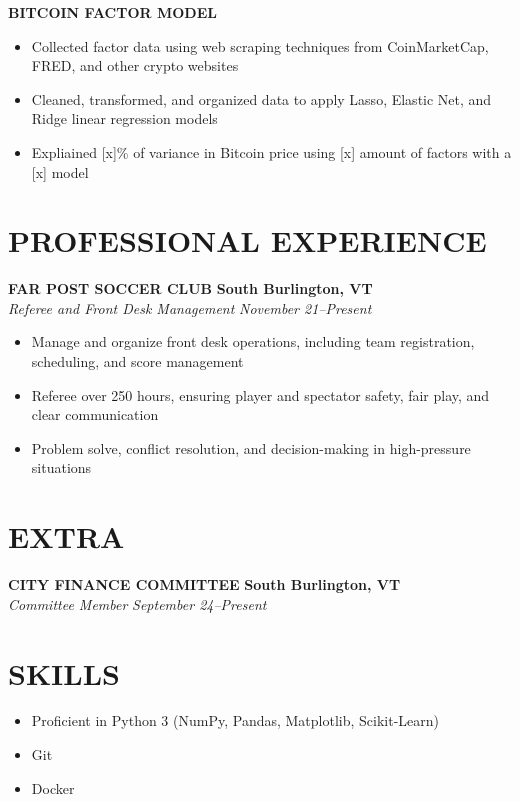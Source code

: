 \documentclass[11pt,letterpaper]{article}
\newcommand{\role}[4]{
  \begin{center}
  \textbf{#1} \hfill \textbf{#2} \\
  \textit{#3} \hfill \textit{#4}
  \end{center}
}
\begin{document}
\begin{flushleft}
  \textbf{BITCOIN FACTOR MODEL}
  \begin{itemize}[leftmargin=*,nosep]
    \item Collected factor data using web scraping techniques from CoinMarketCap, FRED, and other crypto websites
    \item Cleaned, transformed, and organized data to apply Lasso, Elastic Net, and Ridge linear regression models 
    \item Expliained [x]\% of variance in Bitcoin price using [x] amount of factors with a [x] model
  \end{itemize}
\end{flushleft}

\section{PROFESSIONAL EXPERIENCE}
\vspace{1em}
\role{FAR POST SOCCER CLUB}{South Burlington, VT}{Referee and Front Desk Management}{November 21--Present}
\begin{itemize}[leftmargin=*,nosep]
  \item Manage and organize front desk operations, including team registration, scheduling, and score management
  \item Referee over 250 hours, ensuring player and spectator safety, fair play, and clear communication
  \item Problem solve, conflict resolution, and decision-making in high-pressure situations
\end{itemize}


\section{EXTRA}
\vspace{1em}
\role{CITY FINANCE COMMITTEE}{South Burlington, VT}{Committee Member}{September 24--Present}

\vspace{1em}
\section{SKILLS}

\vspace{0.5em}
\begin{itemize}[leftmargin=*,nosep]
  \item Proficient in Python 3 (NumPy, Pandas, Matplotlib, Scikit-Learn)
  \item Git
  \item Docker 
\end{itemize}
\end{document}
